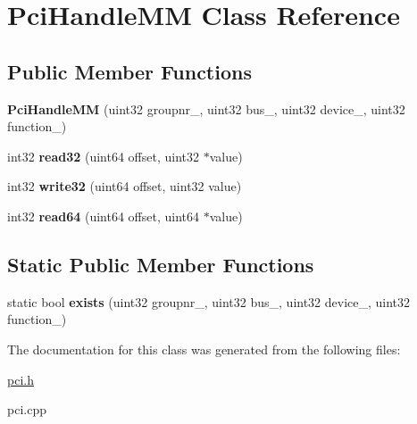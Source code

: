 \hypertarget{class_pci_handle_m_m}{}\section{Pci\+Handle\+MM Class Reference}
\label{class_pci_handle_m_m}
\subsection*{Public Member Functions}
\begin{DoxyCompactItemize}
\item 
\mbox{\label{class_pci_handle_m_m_ad228ca4f3665b17592fdf43229c8a776}} 
{\bfseries Pci\+Handle\+MM} (uint32 groupnr\+\_\+, uint32 bus\+\_\+, uint32 device\+\_\+, uint32 function\+\_\+)
\item 
\mbox{\label{class_pci_handle_m_m_a75b8adf35f6ef1bda3228cf78d07e4d7}} 
int32 {\bfseries read32} (uint64 offset, uint32 $\ast$value)
\item 
\mbox{\label{class_pci_handle_m_m_af57465df47969e4ca08b40cb964b5ef5}} 
int32 {\bfseries write32} (uint64 offset, uint32 value)
\item 
\mbox{\label{class_pci_handle_m_m_a1d9e24e51c83e17aeffd6eb4f1e8ff2c}} 
int32 {\bfseries read64} (uint64 offset, uint64 $\ast$value)
\end{DoxyCompactItemize}
\subsection*{Static Public Member Functions}
\begin{DoxyCompactItemize}
\item 
\mbox{\label{class_pci_handle_m_m_a52ff1efa7fddeeca3f76e2a7b2b328c0}} 
static bool {\bfseries exists} (uint32 groupnr\+\_\+, uint32 bus\+\_\+, uint32 device\+\_\+, uint32 function\+\_\+)
\end{DoxyCompactItemize}


The documentation for this class was generated from the following files\+:\begin{DoxyCompactItemize}
\item 
\mbox{\hyperlink{pci_8h}{pci.\+h}}\item 
pci.\+cpp\end{DoxyCompactItemize}
